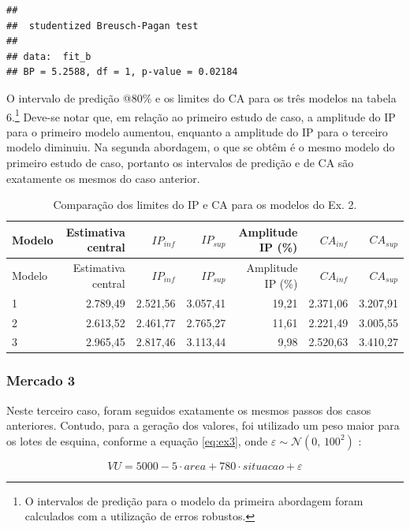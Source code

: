 \documentclass[
  a4paper, 11pt]{article}
\begin{document}
\begin{verbatim}
## 
##  studentized Breusch-Pagan test
## 
## data:  fit_b
## BP = 5.2588, df = 1, p-value = 0.02184
\end{verbatim}

O intervalo de predição @80\% e os limites do CA para os três modelos na
tabela 6.\footnote{O intervalos de predição para o modelo da primeira
  abordagem foram calculados com a utilização de erros robustos.}
Deve-se notar que, em relação ao primeiro estudo de caso, a amplitude do
IP para o primeiro modelo aumentou, enquanto a amplitude do IP para o
terceiro modelo diminuiu. Na segunda abordagem, o que se obtêm é o mesmo
modelo do primeiro estudo de caso, portanto os intervalos de predição e
de CA são exatamente os mesmos do caso anterior.

\begin{longtable}[]{@{}lrrrrrr@{}}
\caption{Comparação dos limites do IP e CA para os modelos do Ex.
2.}\tabularnewline
\toprule
Modelo & Estimativa central & \(IP_{inf}\) & \(IP_{sup}\) & Amplitude IP
(\%) & \(CA_{inf}\) & \(CA_{sup}\)\tabularnewline
\midrule
\endfirsthead
\toprule
Modelo & Estimativa central & \(IP_{inf}\) & \(IP_{sup}\) & Amplitude IP
(\%) & \(CA_{inf}\) & \(CA_{sup}\)\tabularnewline
\midrule
\endhead
1 & 2.789,49 & 2.521,56 & 3.057,41 & 19,21 & 2.371,06 &
3.207,91\tabularnewline
2 & 2.613,52 & 2.461,77 & 2.765,27 & 11,61 & 2.221,49 &
3.005,55\tabularnewline
3 & 2.965,45 & 2.817,46 & 3.113,44 & 9,98 & 2.520,63 &
3.410,27\tabularnewline
\bottomrule
\end{longtable}

\hypertarget{mercado-3}{%
\subsubsection{Mercado 3}\label{mercado-3}}

Neste terceiro caso, foram seguidos exatamente os mesmos passos dos
casos anteriores. Contudo, para a geração dos valores, foi utilizado um
peso maior para os lotes de esquina, conforme a equação \ref{eq:ex3},
onde \(\varepsilon \sim \mathcal{N}(0, \,100^2)\) :

\begin{equation} \label{eq:ex3}
VU = 5000 - 5 \cdot area + 780 \cdot situacao + \varepsilon
\end{equation}
\end{document}
